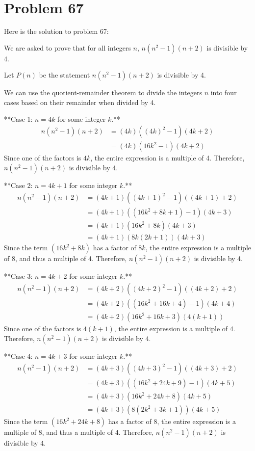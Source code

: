 \documentclass{article}
\begin{document}
\newpage

\section*{Problem 67}
Here is the solution to problem 67:

We are asked to prove that for all integers $n$, $n(n^2 - 1)(n + 2)$ is divisible by 4.

Let $P(n)$ be the statement $n(n^2 - 1)(n + 2)$ is divisible by 4.

We can use the quotient-remainder theorem to divide the integers $n$ into four cases based on their remainder when divided by 4.

**Case 1: $n = 4k$ for some integer $k$.**
\begin{align*} n(n^2 - 1)(n + 2) &= (4k)((4k)^2 - 1)(4k + 2) \\ &= (4k)(16k^2 - 1)(4k + 2)\end{align*}
Since one of the factors is $4k$, the entire expression is a multiple of 4. Therefore, $n(n^2 - 1)(n + 2)$ is divisible by 4.

**Case 2: $n = 4k + 1$ for some integer $k$.**
\begin{align*} n(n^2 - 1)(n + 2) &= (4k + 1)((4k + 1)^2 - 1)((4k + 1) + 2) \\ &= (4k + 1)((16k^2 + 8k + 1) - 1)(4k + 3) \\ &= (4k + 1)(16k^2 + 8k)(4k + 3) \\ &= (4k + 1)(8k(2k + 1))(4k + 3)\end{align*}
Since the term $(16k^2 + 8k)$ has a factor of $8k$, the entire expression is a multiple of 8, and thus a multiple of 4. Therefore, $n(n^2 - 1)(n + 2)$ is divisible by 4.

**Case 3: $n = 4k + 2$ for some integer $k$.**
\begin{align*} n(n^2 - 1)(n + 2) &= (4k + 2)((4k + 2)^2 - 1)((4k + 2) + 2) \\ &= (4k + 2)((16k^2 + 16k + 4) - 1)(4k + 4) \\ &= (4k + 2)(16k^2 + 16k + 3)(4(k + 1))\end{align*}
Since one of the factors is $4(k + 1)$, the entire expression is a multiple of 4. Therefore, $n(n^2 - 1)(n + 2)$ is divisible by 4.

**Case 4: $n = 4k + 3$ for some integer $k$.**
\begin{align*} n(n^2 - 1)(n + 2) &= (4k + 3)((4k + 3)^2 - 1)((4k + 3) + 2) \\ &= (4k + 3)((16k^2 + 24k + 9) - 1)(4k + 5) \\ &= (4k + 3)(16k^2 + 24k + 8)(4k + 5) \\ &= (4k + 3)(8(2k^2 + 3k + 1))(4k + 5)\end{align*}
Since the term $(16k^2 + 24k + 8)$ has a factor of 8, the entire expression is a multiple of 8, and thus a multiple of 4. Therefore, $n(n^2 - 1)(n + 2)$ is divisible by 4.
\end{document}
